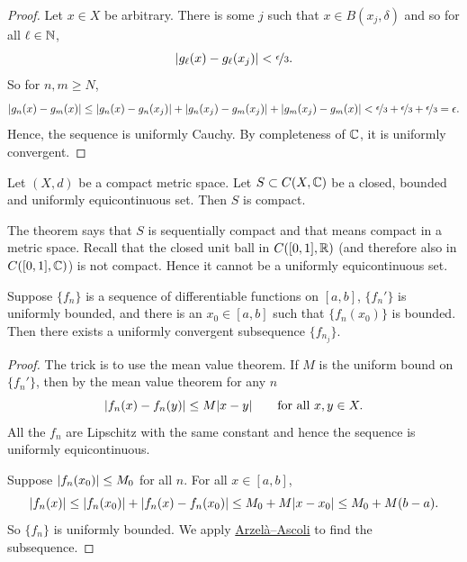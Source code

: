 \begin{proof}
Let $x \in X$ be arbitrary.  There is some $j$ such that
$x \in B(x_j,\delta)$ and so for all $\ell \in {\mathbb{N}}$,
\begin{equation*}
\lvert {g_\ell(x)-g_\ell(x_j)} \rvert < \nicefrac{\epsilon}{3}.
\end{equation*}
So for $n,m \geq N$,
\begin{equation*}
\lvert {g_n(x)-g_m(x)} \rvert \leq
\lvert {g_n(x)-g_n(x_j)} \rvert +
\lvert {g_n(x_j)-g_m(x_j)} \rvert +
\lvert {g_m(x_j)-g_m(x)} \rvert <
\nicefrac{\epsilon}{3} +
\nicefrac{\epsilon}{3} +
\nicefrac{\epsilon}{3} = \epsilon .
\end{equation*}
Hence, the sequence is uniformly Cauchy.  By completeness of ${\mathbb{C}}$,
it is uniformly convergent.
\end{proof}

\begin{cor}
Let $(X,d)$ be a compact metric space.
Let $S \subset C(X,{\mathbb{C}})$ be a closed, bounded and uniformly equicontinuous set.
Then $S$ is compact.
\end{cor}

The theorem says that $S$
is sequentially compact and that means
compact in a metric space.
Recall that the closed unit ball in $C([0,1],{\mathbb{R}})$ (and therefore also in
$C([0,1],{\mathbb{C}})$) is not compact.
Hence it cannot be a uniformly equicontinuous set.

\begin{cor}
Suppose $\{ f_n \}$ is a sequence of differentiable functions on $[a,b]$,
$\{ f_n' \}$ is uniformly bounded, and there is an
$x_0 \in [a,b]$ such that $\{ f_n(x_0) \}$ is bounded.
Then there exists a uniformly convergent
subsequence $\{ f_{n_j} \}$.
\end{cor}

\begin{proof}
The trick is to use the mean value theorem.  If $M$ is the uniform bound on
$\{ f_n' \}$, then by the mean value theorem for any $n$
\begin{equation*}
\lvert {f_n(x)-f_n(y)} \rvert \leq M \lvert {x-y} \rvert \qquad \text{for all } x,y \in X.
\end{equation*}
All the $f_n$ are Lipschitz with the same constant and hence
the sequence is
uniformly equicontinuous.

Suppose $\lvert {f_n(x_0)} \rvert \leq M_0$ for all $n$.
For all $x \in [a,b]$,
\begin{equation*}
\lvert {f_n(x)} \rvert \leq \lvert {f_n(x_0)} \rvert+ \lvert {f_n(x)-f_n(x_0)} \rvert \leq M_0+ M \lvert {x-x_0} \rvert
\leq M_0 + M(b-a) .
\end{equation*}
So $\{ f_n \}$ is uniformly bounded.
We apply \hyperref[thm:arzelaascoli]{Arzel\`a--Ascoli} to find the subsequence.
\end{proof}

